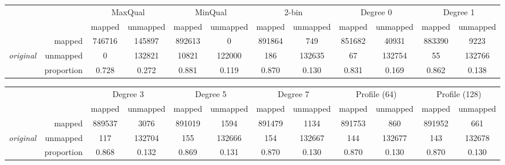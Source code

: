 \begin{landscape}
\renewcommand{\baselinestretch}{1}
\small\normalsize

\begin{table}[!tbhp]
\centering
\begin{tabular}{lr|cc|cc|cc|cc|cc}
 & & \multicolumn{2}{c|}{MaxQual} & \multicolumn{2}{c|}{MinQual} & \multicolumn{2}{c|}{2-bin} & \multicolumn{2}{c|}{Degree 0} & \multicolumn{2}{c}{Degree 1} \\
& & mapped & unmapped & mapped & unmapped & mapped & unmapped & mapped & unmapped & mapped & unmapped \\
\cline{2-12}
& mapped & 746716 & 145897 & 892613 &   0 & 891864 & 749 & 851682 & 40931 & 883390 & 9223 \\
{\em original} & unmapped &   0 & 132821 & 10821 & 122000 & 186 & 132635 &  67 & 132754 &  55 & 132766 \\
\cline{2-12}
& proportion & 0.728 & 0.272 & 0.881 & 0.119 & 0.870 & 0.130 & 0.831 & 0.169 & 0.862 & 0.138 \\
\end{tabular}

\bigskip

\begin{tabular}{lr|cc|cc|cc|cc|cc}
 & & \multicolumn{2}{c|}{Degree 3} & \multicolumn{2}{c|}{Degree 5} & \multicolumn{2}{c|}{Degree 7} & \multicolumn{2}{c|}{Profile (64)} & \multicolumn{2}{c}{Profile (128)} \\
& & mapped & unmapped & mapped & unmapped & mapped & unmapped & mapped & unmapped & mapped & unmapped \\
\cline{2-12}
& mapped & 889537 & 3076 & 891019 & 1594 & 891479 & 1134 & 891753 & 860 & 891952 & 661 \\
{\em original} & unmapped & 117 & 132704 & 155 & 132666 & 154 & 132667 & 144 & 132677 & 143 & 132678 \\
\cline{2-12}
& proportion & 0.868 & 0.132 & 0.869 & 0.131 & 0.870 & 0.130 & 0.870 & 0.130 & 0.870 & 0.130 \\
\end{tabular}

\bigskip


\end{table}
\end{landscape}
